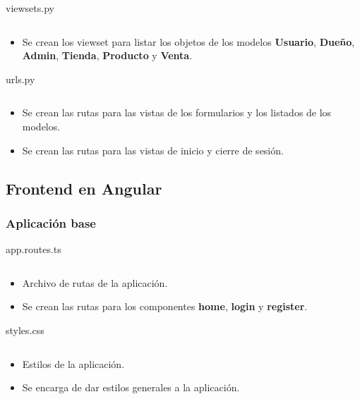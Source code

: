 \documentclass{article}
\newenvironment{block}{\captionsetup{type=listing}}{}
\begin{document}
\begin{block}
	\caption{viewsets.py}
	\inputminted{Python}{kioskios_api/api/viewsets.py}
	\begin{itemize}
		\item Se crean los viewset para listar los objetos de los modelos \textbf{Usuario}, \textbf{Dueño}, \textbf{Admin}, \textbf{Tienda}, \textbf{Producto} y \textbf{Venta}.
	\end{itemize}

	\caption{urls.py}
	\inputminted{Python}{kioskios_api/api/urls.py}
	\begin{itemize}
		\item Se crean las rutas para las vistas de los formularios y los listados de los modelos.
		\item Se crean las rutas para las vistas de inicio y cierre de sesión.
	\end{itemize}
\end{block}
\pagebreak

\subsection{Frontend en Angular}
\subsubsection{Aplicación base}
\begin{block}
	\caption{app.routes.ts}
	\inputminted{TypeScript}{kioskios_web/src/app/app.routes.ts}
	\begin{itemize}
		\item Archivo de rutas de la aplicación.
		\item Se crean las rutas para los componentes \textbf{home}, \textbf{login} y \textbf{register}.
	\end{itemize}

	\caption{styles.css}
	\inputminted{CSS}{kioskios_web/src/styles.css}
	\begin{itemize}
		\item Estilos de la aplicación.
		\item Se encarga de dar estilos generales a la aplicación.
	\end{itemize}
\end{block}
\end{document}
